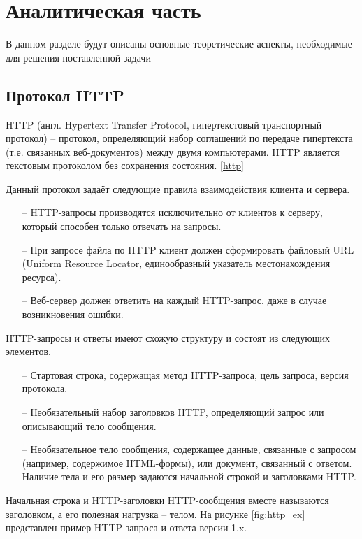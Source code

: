 \section{Аналитическая часть}

В данном разделе будут описаны основные теоретические аспекты, необходимые для решения поставленной задачи

\subsection{Протокол HTTP}

HTTP (англ. Hypertext Transfer Protocol, гипертекстовый транспортный
протокол) -- протокол, определяющий набор соглашений по передаче гипертекста (т.е. связанных веб-документов) между двумя компьютерами. HTTP
является текстовым протоколом без сохранения состояния. \ref{http}

Данный протокол задаёт следующие правила взаимодействия клиента и
сервера. 

\begin{itemize}[leftmargin=1.6\parindent]
	\item[--] HTTP-запросы производятся исключительно от клиентов к серверу, который способен только отвечать на запросы.
	\item[--] При запросе файла по HTTP клиент должен сформировать файловый
	URL (Uniform Resource Locator, единообразный указатель местонахождения ресурса).
	\item[--] Веб-сервер должен ответить на каждый HTTP-запрос, даже в случае возникновения ошибки.
\end{itemize}

HTTP-запросы и ответы имеют схожую структуру и состоят из следующих элементов. 
\begin{itemize}[leftmargin=1.6\parindent]
	\item[--] Стартовая строка, содержащая метод HTTP-запроса, цель запроса, версия протокола.
	\item[--] Необязательный набор заголовков HTTP, определяющий запрос или описывающий тело сообщения.
	\item[--] Необязательное тело сообщения, содержащее данные, связанные с запросом (например, содержимое HTML-формы), или документ, связанный с ответом. Наличие тела и его размер задаются начальной строкой и заголовками HTTP.
\end{itemize}

\newpage
Начальная строка и HTTP-заголовки HTTP-сообщения вместе называются заголовком, а его полезная нагрузка -- телом.
На рисунке \ref{fig:http_ex} представлен пример HTTP запроса и ответа версии 1.x.

